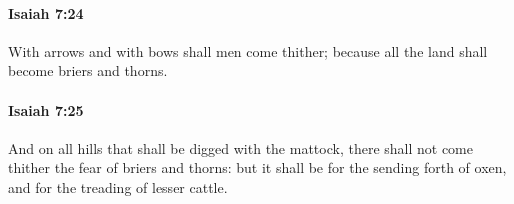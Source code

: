 		\paragraph{Isaiah 7:24} %
			\label{ISAIAH-7-24}

			With arrows and with bows shall men come thither; because all the land shall become briers and thorns.


		\paragraph{Isaiah 7:25} %
			\label{ISAIAH-7-25}

			And on all hills that shall be digged with the mattock, there shall not come thither the fear of briers and thorns: but it shall be for the sending forth of oxen, and for the treading of lesser cattle.

